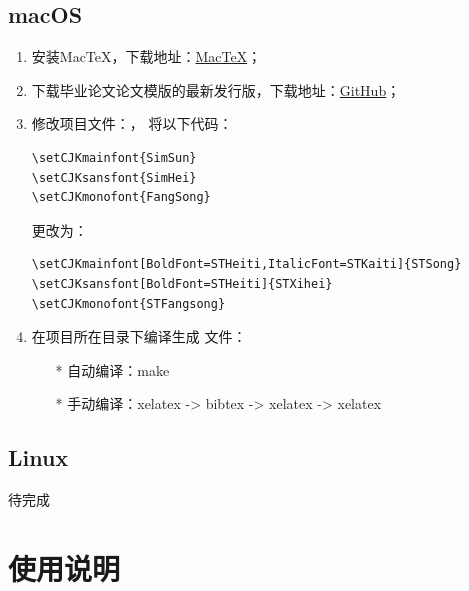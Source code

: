 \documentclass[zihao = -4,cn]{oucart}
\begin{document}
\subsection{macOS}
\begin{enumerate}
	\item 安装MacTeX，下载地址：\href{http://www.tug.org/mactex/}{MacTeX}；
	\item 下载毕业论文论文模版的最新发行版，下载地址：\href{https://github.com/OSOUC/UndergraduateThesisLaTeXTemplate/releases}{GitHub}；
	\item 修改项目文件：，\songti
	将以下代码：
	\begin{lstlisting}
\setCJKmainfont{SimSun}
\setCJKsansfont{SimHei}
\setCJKmonofont{FangSong}
	\end{lstlisting}
	更改为：
		\begin{lstlisting}
\setCJKmainfont[BoldFont=STHeiti,ItalicFont=STKaiti]{STSong}
\setCJKsansfont[BoldFont=STHeiti]{STXihei}
\setCJKmonofont{STFangsong}
	\end{lstlisting} 
	\item 在项目所在目录下编译生成 \songti 文件：
	\begin{itemize}
		\item[*]  自动编译：make
		\item[*]  手动编译：xelatex -> bibtex -> xelatex -> xelatex
	\end{itemize}
\end{enumerate}
\subsection{Linux}
待完成
\section{使用说明}
\end{document}
